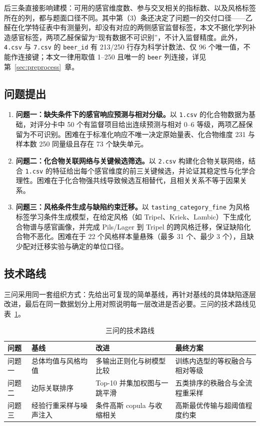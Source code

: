\documentclass[UTF8,a4paper,zihao=-4]{ctexart}
\numberwithin{figure}{section}
\numberwithin{table}{section}
\numberwithin{equation}{section}
\newcommand{\file}[1]{\texttt{#1}}
\begin{document}
后三条直接影响建模：可用的感官维度数、参与交叉相关的指标数、以及风格标签所在的列，都与题面口径不同。其中第（3）条还决定了问题一的交付口径——乙醛在化学特征表中有测量列，却没有对应的两侧感官监督标签，本文不据化学列补造感官标签，两项乙醛保留为“现有数据不可识别”，不计入监督精度。此外，\file{4.csv} 与 \file{7.csv} 的 \file{beer\_id} 有 213/250 行存为科学计数法、仅 96 个唯一值，不能作连接键；本文一律用取值 1--250 且唯一的 \file{beer} 列连接，详见第~\ref{sec:preprocess}~章。

\subsection{问题提出}

\begin{enumerate}[label=（\arabic*）,leftmargin=2.5em,itemsep=2pt]
  \item \textbf{问题一：缺失条件下的感官响应预测与相对分级。}以 \file{1.csv} 的化合物数据为基础，对评分卡中 50 个有监督项目给出连续预测与相对 0--6 等级，两项乙醛保留为不可识别。困难在于标准化响应不唯一决定原始量表、化合物维度 231 与样本数 250 同量级且存在 73 个缺失单元。
  \item \textbf{问题二：化合物关联网络与关键候选筛选。}以 \file{2.csv} 构建化合物关联网络，结合 \file{1.csv} 的特征给出每个感官维度的前三关键候选，并论证其稳定性与化学合理性。困难在于化合物强共线导致候选互相替代，且相关关系不等于因果关系。
  \item \textbf{问题三：风格条件生成与缺陷约束迁移。}以 \file{tasting\_category\_fine} 为风格标签学习条件生成模型，在给定风格（如 Tripel、Kriek、Lambic）下生成化合物谱与感官画像，并完成 Pils/Lager 到 Tripel 的跨风格迁移，保证缺陷化合物不恶化。困难在于 22 个风格样本量悬殊（最多 31 个、最少 3 个），且缺少配对迁移实验与确定的单位口径。
\end{enumerate}

\subsection{技术路线}

三问采用同一套组织方式：先给出可复现的简单基线，再针对基线的具体缺陷逐层改进，最后在同一数据划分上用对照说明每一层改进是否必要。三问的技术路线见表~\ref{tab:roadmap}。

\begin{table}[H]
  \centering
  \caption{三问的技术路线}
  \label{tab:roadmap}
  \footnotesize
  \begin{tabularx}{\textwidth}{@{}l >{\hsize=0.82\hsize}X >{\hsize=1.12\hsize}X >{\hsize=1.06\hsize}X@{}}
    \toprule
    问题 & 基线 & 改进 & 最终方案 \\
    \midrule
    问题一 & 总体均值与风格均值 & 多输出正则化与树模型比较 & 训练内选型的等权融合与相对等级 \\
    问题二 & 边际关联排序 & Top-10 并集加权图与一跳平滑 & 五类排序的秩融合与全流程重采样 \\
    问题三 & 经验行重采样与噪声注入 & 条件高斯 copula 与收缩相关 & 高斯最优传输与超阈值程度约束 \\
    \bottomrule
  \end{tabularx}
\end{table}
\end{document}
